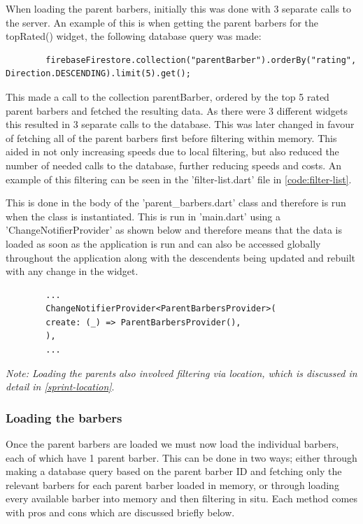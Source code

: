 \documentclass[12pt]{article}
\begin{document}
	When loading the parent barbers, initially this was done with 3 separate calls to the server. An example of this is when getting the parent barbers for the topRated() widget, the following database query was made: 
	\begin{lstlisting}
		firebaseFirestore.collection("parentBarber").orderBy("rating", Direction.DESCENDING).limit(5).get();
	\end{lstlisting}
	This made a call to the collection parentBarber, ordered by the top 5 rated parent barbers and fetched the resulting data. As there were 3 different widgets this resulted in 3 separate calls to the database. This was later changed in favour of fetching all of the parent barbers first before filtering within memory. This aided in not only increasing speeds due to local filtering, but also reduced the number of needed calls to the database, further reducing speeds and costs. An example of this filtering can be seen in the 'filter-list.dart' file in \autoref{code:filter-list}.
	\newline
	
	This is done in the body of the 'parent\_barbers.dart' class and therefore is run when the class is instantiated. This is run in 'main.dart' using a 'ChangeNotifierProvider' as shown below and therefore means that the data is loaded as soon as the application is run and can also be accessed globally throughout the application along with the descendents being updated and rebuilt with any change in the widget.
	
	\begin{verbatim}
		...
		ChangeNotifierProvider<ParentBarbersProvider>(
		create: (_) => ParentBarbersProvider(),
		),
		...
	\end{verbatim}
	
	
	\noindent
	\emph{Note: Loading the parents also involved filtering via location, which is discussed in detail in \autoref{sprint-location}}.
	
	
	\subsubsection{Loading the barbers}
	Once the parent barbers are loaded we must now load the individual barbers, each of which have 1 parent barber. This can be done in two ways; either through making a database query based on the parent barber ID and fetching only the relevant barbers for each parent barber loaded in memory, or through loading every available barber into memory and then filtering in situ. Each method comes with pros and cons which are discussed briefly below.
	\newline
	
\end{document}

